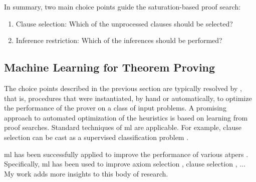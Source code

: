 In summary, two main choice points guide the \gls{saturation}-based proof search:
\begin{enumerate}
\item Clause selection: Which of the unprocessed clauses should be selected?
\item Inference restriction: Which of the inferences should be performed?
\end{enumerate}

\subsection{Machine Learning for Theorem Proving}

The choice points described in the previous section are typically resolved by ,
that is, procedures that were instantiated, by hand or automatically, to optimize the performance of the prover on a class of input problems.
A promising approach to automated optimization of the heuristics is based on learning from proof searches.
Standard techniques of \gls{ml} are applicable.
For example, clause selection can be cast as a supervised classification problem \cite{}.

\Gls{ml} has been successfully applied to improve the performance of various \glspl{atper} \cite{DBLP:journals/corr/abs-2403-04017}.
Specifically, \gls{ml} has been used to improve axiom selection \cite{}, clause selection \cite{}, ...
My work adds more insights to this body of research.


